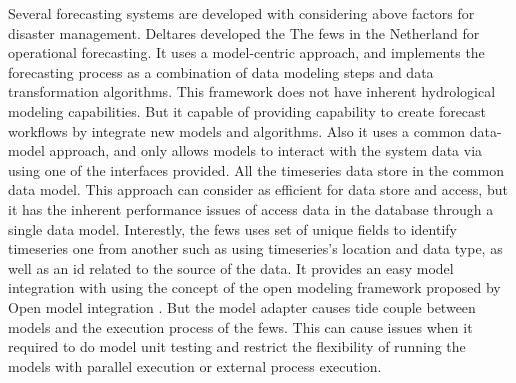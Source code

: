 \documentclass[conference]{IEEEtran}
\newcommand{\db}[1]{\textcolor{blue!40}{#1}}
\begin{document}
\db{Several forecasting systems are} developed with considering above factors for disaster management. Deltares developed the The \acrfull{fews}\cite{Werner2013TheSystem} in the Netherland for operational forecasting. It uses a model-centric approach, and implements the forecasting process as a combination of data modeling steps and data transformation algorithms. This framework does not have inherent hydrological modeling capabilities. But it capable of providing capability to create forecast workflows by integrate new models and algorithms. Also it uses a common data-model approach, and only allows models to interact with the system data via using one of the interfaces provided. All the timeseries data store in the common data model. This approach can consider as efficient for data store and access, but it has the inherent performance issues of access data in the database through a single data model. Interestly, the \acrshort{fews} uses set of unique fields to identify timeseries one from another such as using timeseries's location and data type, as well as an id related to the source of the data. It provides an easy model integration with using the concept of the open modeling framework proposed by Open model integration \cite{Kokkonen2003InterfacingXML}. But the model adapter causes tide couple between models and the execution process of the \acrshort{fews}. This can cause issues when it required to do model unit testing and restrict the flexibility of running the models with parallel execution or external process execution.
\end{document}
